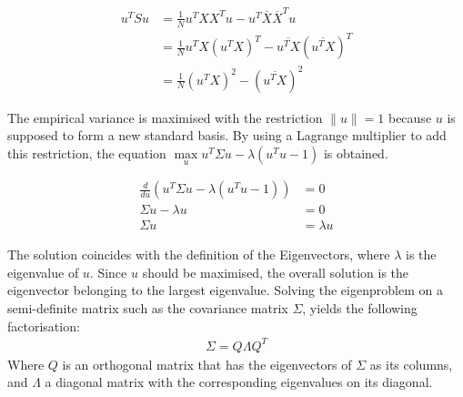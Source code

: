 \documentclass[a4paper, 11pt]{article}
\begin{document}
\begin{align*}
u^T S u & = \frac{1}{N} u^T X X^T u - u^T \overline{X} \overline{X}^T u \\
& = \frac{1}{N} u^T X (u^T X)^T  -  \overline{u^TX} (\overline{u^TX})^T  \\
& = \frac{1}{N} (u^T X)^2 - (\overline{u^TX})^2
\end{align*}

The empirical variance is maximised with the restriction $\parallel u \parallel = 1$ because $u$ is supposed to form a new standard basis. By using a Lagrange multiplier to add this restriction, the equation $\max\limits_{u} u^T \Sigma u - \lambda(u^T u - 1)$ is obtained.

\begin{align*}
 \frac{d}{du} (u^T \Sigma u - \lambda(u^T u - 1)) & = 0 \\
 \Sigma u - \lambda u & = 0 \\
 \Sigma u & = \lambda u 
\end{align*}

The solution coincides with the definition of the Eigenvectors, where $\lambda$ is the eigenvalue of $u$. Since $u$ should be maximised, the overall solution is the eigenvector belonging to the largest eigenvalue.
Solving the eigenproblem on a semi-definite matrix such as the covariance matrix $\Sigma$, yields the following factorisation:
\begin{align*}
\Sigma = Q \Lambda Q^T
\end{align*}
Where $Q$ is an orthogonal matrix that has the eigenvectors of $\Sigma$ as its columns, and $\Lambda$ a diagonal matrix with the corresponding eigenvalues on its diagonal.
\end{document}
